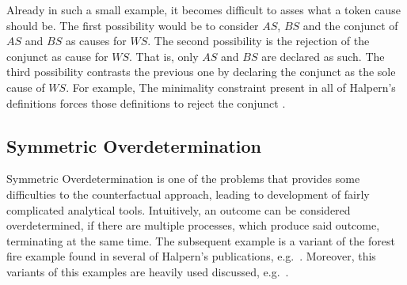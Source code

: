 \documentclass[11pt,a4paper]{book}
\theoremstyle{definition}
\theoremstyle{definition}
\theoremstyle{definition}
\theoremstyle{remark}
\begin{document}
Already in such a small example, it becomes difficult to asses what a token cause should be. 
The first possibility would be to consider $AS$, $BS$ and the conjunct of $AS$ and $BS$ as causes for $WS$.
The second possibility is the rejection of the conjunct as cause for $WS$. That is, only $AS$ and $BS$ are declared as such.
The third possibility contrasts the previous one by declaring the conjunct as the sole cause of $WS$.
For example, The minimality constraint present in all of Halpern's definitions forces those definitions to reject the conjunct \parencite[p.~28]{halpern2016actual}.


%
%








\subsection{Symmetric Overdetermination}
Symmetric Overdetermination is one of the problems that provides some difficulties to the counterfactual approach, leading to development of fairly complicated analytical tools.
Intuitively, an outcome can be considered overdetermined, if there are multiple processes,  which produce said outcome, terminating at the same time. 
The subsequent example is a variant of the forest fire example found in several of Halpern's publications, e.g.\  \parencite{halpern2011actual,halpern2015graded}.
Moreover, this variants of this examples are heavily used discussed, e.g.\ \parencite{glymour2010actual,halpern2011actual,baumgartner2013regularity,halpern2015graded,weslake2015partial,blanchard2017cause,wright2017ness,
bochman2018actual,beckers2018principled,denecker2018causal,batusov2018situation,denecker2019explaining,liepicna2020arguing}.
\end{document}
